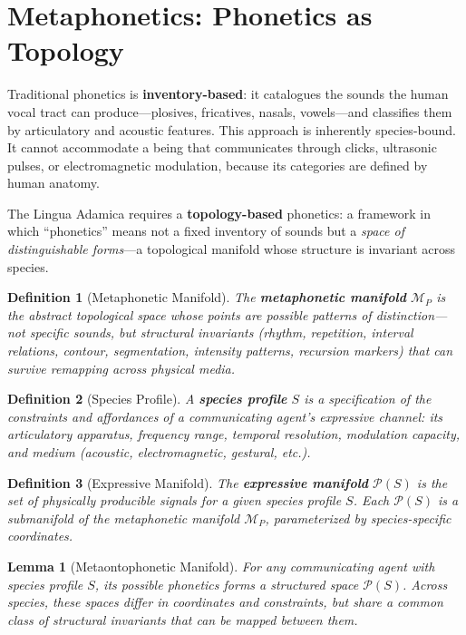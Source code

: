 \documentclass[12pt, letterpaper]{book}
\newtheorem{lemma}[theorem]{Lemma}
\newtheorem{definition}{Definition}[chapter]
\begin{document}
\section{Metaphonetics: Phonetics as Topology}

Traditional phonetics is \textbf{inventory-based}: it catalogues the sounds the human vocal tract can produce---plosives, fricatives, nasals, vowels---and classifies them by articulatory and acoustic features. This approach is inherently species-bound. It cannot accommodate a being that communicates through clicks, ultrasonic pulses, or electromagnetic modulation, because its categories are defined by human anatomy.

The Lingua Adamica requires a \textbf{topology-based} phonetics: a framework in which ``phonetics'' means not a fixed inventory of sounds but a \textit{space of distinguishable forms}---a topological manifold whose structure is invariant across species.

\begin{definition}[Metaphonetic Manifold]\label{def:metaphonetic}
The \textbf{metaphonetic manifold} $\mathcal{M}_P$ is the abstract topological space whose points are \textit{possible patterns of distinction}---not specific sounds, but structural invariants (rhythm, repetition, interval relations, contour, segmentation, intensity patterns, recursion markers) that can survive remapping across physical media.
\end{definition}

\begin{definition}[Species Profile]\label{def:species-profile}
A \textbf{species profile} $S$ is a specification of the constraints and affordances of a communicating agent's expressive channel: its articulatory apparatus, frequency range, temporal resolution, modulation capacity, and medium (acoustic, electromagnetic, gestural, etc.).
\end{definition}

\begin{definition}[Expressive Manifold]\label{def:expressive-manifold}
The \textbf{expressive manifold} $\mathcal{P}(S)$ is the set of physically producible signals for a given species profile $S$. Each $\mathcal{P}(S)$ is a submanifold of the metaphonetic manifold $\mathcal{M}_P$, parameterized by species-specific coordinates.
\end{definition}

\begin{lemma}[Metaontophonetic Manifold]\label{lem:metaonto}
For any communicating agent with species profile $S$, its possible phonetics forms a structured space $\mathcal{P}(S)$. Across species, these spaces differ in coordinates and constraints, but share a common class of structural invariants that can be mapped between them.
\end{lemma}
\end{document}
